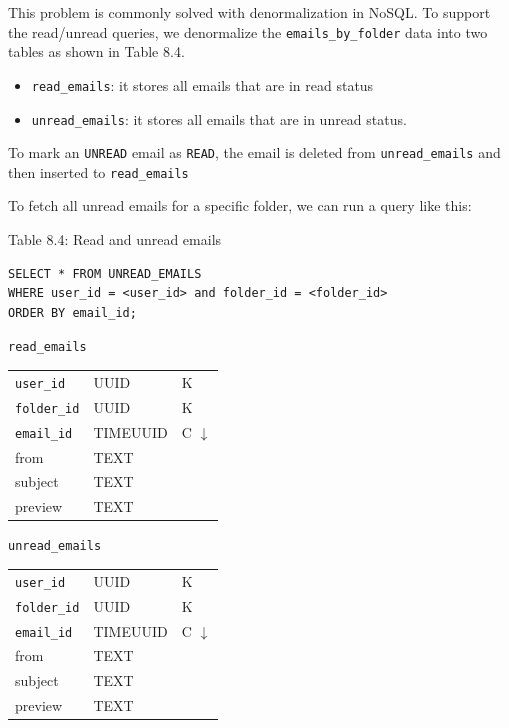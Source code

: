 \documentclass{report}
\theoremstyle{definition}
\begin{document}
This problem is commonly solved with denormalization in NoSQL. To support the read/unread queries,
we denormalize the \lstinline|emails_by_folder| data into two tables as shown in Table 8.4.

\begin{itemize}
\item
\lstinline|read_emails|: it stores all emails that are in read status
\item
\lstinline|unread_emails|: it stores all emails that are in unread status.
\end{itemize}

To mark an \lstinline|UNREAD| email as \lstinline|READ|, the email is deleted from \lstinline|unread_emails| and then inserted to \lstinline|read_emails|

To fetch all unread emails for a specific folder, we can run a query like this:

Table 8.4: Read and unread emails

\begin{lstlisting}
SELECT * FROM UNREAD_EMAILS
WHERE user_id = <user_id> and folder_id = <folder_id>
ORDER BY email_id;
\end{lstlisting}

\lstinline|read_emails|

\begin{tabular}{|p{4cm}|p{4cm}|p{4cm}|}
\hline
\lstinline|user_id| & UUID & K \\
\lstinline|folder_id| & UUID & K \\
\lstinline|email_id| & TIMEUUID & C $\downarrow$ \\
from & TEXT & \\
subject & TEXT & \\
preview & TEXT & \\
\hline
\end{tabular}

\lstinline|unread_emails|

\begin{tabular}{|p{4cm}|p{4cm}|p{4cm}|}
\hline
\lstinline|user_id| & UUID & K \\
\lstinline|folder_id| & UUID & K \\
\lstinline|email_id| & TIMEUUID & C $\downarrow$ \\
from & TEXT & \\
subject & TEXT & \\
preview & TEXT & \\
\hline
\end{tabular}
\end{document}
